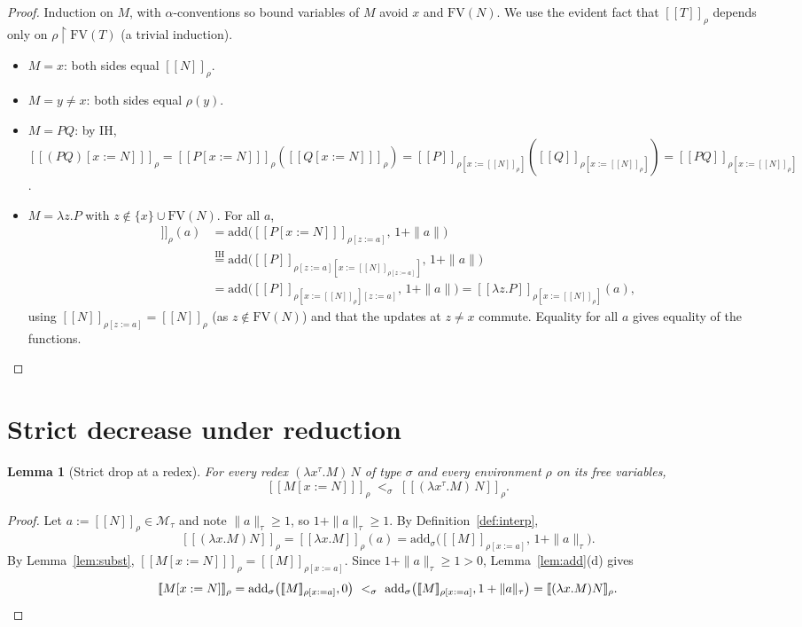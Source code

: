 \documentclass{amsart}
\newtheorem{lemma}{Lemma}
\theoremstyle{definition}
\newcommand{\interp}[1]{[\![#1]\!]}
\newcommand{\FV}{\mathrm{FV}}
\begin{document}
\begin{proof}
Induction on $M$, with $\alpha$-conventions so bound variables of $M$ avoid $x$ and
$\FV(N)$. We use the evident fact that $\interp{T}_\rho$ depends only on $\rho{\restriction}\FV(T)$
(a trivial induction).
\begin{itemize}
\item $M=x$: both sides equal $\interp N_\rho$.
\item $M=y\neq x$: both sides equal $\rho(y)$.
\item $M=PQ$: by IH,
  $\interp{(PQ)[x:=N]}_\rho=\interp{P[x:=N]}_\rho(\interp{Q[x:=N]}_\rho)
  =\interp{P}_{\rho[x:=\interp N_\rho]}(\interp{Q}_{\rho[x:=\interp N_\rho]})=\interp{PQ}_{\rho[x:=\interp N_\rho]}$.
\item $M=\lambda z.P$ with $z\notin\{x\}\cup\FV(N)$. For all $a$,
  \begin{align*}
   \interp{(\lambda z.P)[x:=N]}_\rho(a)
   &=\mathrm{add}\bigl(\interp{P[x:=N]}_{\rho[z:=a]},\,1+\|a\|\bigr)\\
   &\overset{\text{IH}}{=}\mathrm{add}\bigl(\interp{P}_{\rho[z:=a][x:=\interp N_{\rho[z:=a]}]},\,1+\|a\|\bigr)\\
   &=\mathrm{add}\bigl(\interp{P}_{\rho[x:=\interp N_\rho][z:=a]},\,1+\|a\|\bigr)
   =\interp{\lambda z.P}_{\rho[x:=\interp N_\rho]}(a),
  \end{align*}
  using $\interp N_{\rho[z:=a]}=\interp N_\rho$ (as $z\notin\FV(N)$) and that the updates
  at $z\neq x$ commute. Equality for all $a$ gives equality of the functions.
\end{itemize}
\end{proof}

\section{Strict decrease under reduction}

\begin{lemma}[Strict drop at a redex]\label{lem:redex}
For every redex $(\lambda x^\tau.M)\,N$ of type $\sigma$ and every environment $\rho$
on its free variables,
\[
  \interp{M[x:=N]}_\rho\;<_\sigma\;\interp{(\lambda x^\tau.M)\,N}_\rho .
\]
\end{lemma}

\begin{proof}
Let $a:=\interp N_\rho\in\mathcal M_\tau$ and note $\|a\|_\tau\ge 1$, so $1+\|a\|_\tau\ge 1$.
By Definition~\ref{def:interp},
\[
  \interp{(\lambda x.M)N}_\rho=\interp{\lambda x.M}_\rho(a)
  =\mathrm{add}_\sigma\bigl(\interp{M}_{\rho[x:=a]},\,1+\|a\|_\tau\bigr).
\]
By Lemma~\ref{lem:subst}, $\interp{M[x:=N]}_\rho=\interp{M}_{\rho[x:=a]}$. Since
$1+\|a\|_\tau\ge 1>0$, Lemma~\ref{lem:add}(d) gives
\[
  \interp{M[x:=N]}_\rho=\mathrm{add}_\sigma\bigl(\interp{M}_{\rho[x:=a]},0\bigr)
  \ <_\sigma\
  \mathrm{add}_\sigma\bigl(\interp{M}_{\rho[x:=a]},1+\|a\|_\tau\bigr)=\interp{(\lambda x.M)N}_\rho.\qedhere
\]
\end{proof}
\end{document}
